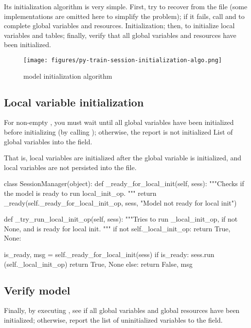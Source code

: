 \begin{content}
Its initialization algorithm is very simple. First, try to recover from the  file (some implementations are omitted here to simplify the problem); if it fails, call  and  to complete global variables and resources. Initialization; then, to initialize local variables and tables; finally, verify that all global variables and resources have been initialized.

\begin{figure}[!htbp]
  \centering
  \texttt{[image: figures/py-train-session-initialization-algo.png]}
  \caption{model initialization algorithm}
  \label{fig:py-train-session-initialization-algo}
\end{figure}


\subsection{Local variable initialization}
For non-empty , you must wait until all global variables have been initialized before initializing (by calling ); otherwise, the report is not initialized List of global variables into the  field.

That is, local variables are initialized after the global variable is initialized, and local variables are not persisted into the  file.

\begin{leftbar}
\begin{python}
class SessionManager(object):
  def _ready_for_local_init(self, sess):
    """Checks if the model is ready to run local_init_op.
    """
    return _ready(self._ready_for_local_init_op, sess,
                  "Model not ready for local init")

  def _try_run_local_init_op(self, sess):
    """Tries to run _local_init_op, if not None, 
       and is ready for local init.
    """
    if not self._local_init_op:
      return True, None:
    
    is_ready, msg = self._ready_for_local_init(sess)
    if is_ready:
      sess.run (self._local_init_op)
      return True, None
    else:
      return False, msg
\end{python}
\end{leftbar}


\subsection{Verify model}
Finally, by executing , see if all global variables and global resources have been initialized; otherwise, report the list of uninitialized variables to the  field.


\end{content}

